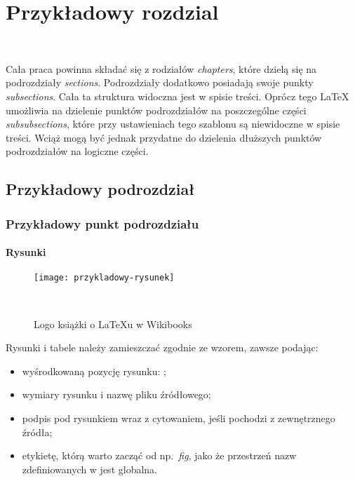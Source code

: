 \chapter{Przykładowy rozdzial}
~\label{chpt:przykladowy-rozdzial}

Cała praca powinna składać się z rodziałów \emph{chapters}, które dzielą
się na podrozdziały \emph{sections}. Podrozdziały dodatkowo
posiadają swoje punkty \emph{subsections}. Cała ta struktura widoczna
jest w spisie treści. Oprócz tego LaTeX umożliwia na dzielenie punktów
podrozdziałów na poszczególne części \emph{subsubsections}, które przy
ustawieniach tego szablonu są niewidoczne w spisie treści. Wciąż mogą
być jednak przydatne do dzielenia dłuższych punktów podrozdziałów na
logiczne części.

\section{Przykładowy podrozdział}

\subsection{Przykładowy punkt podrozdziału}

\subsubsection{Rysunki}

\begin{figure}[!htb]
    \centering
    \texttt{[image: przykladowy-rysunek]}
    \caption{Logo książki o LaTeXu w Wikibooks~\cite{book:latex}}~\label{fig:przykladowy-rysunek}
\end{figure}

Rysunki i tabele należy zamieszczać zgodnie ze wzorem, zawsze podając:

\begin{itemize}
    \item wyśrodkowaną pozycję rysunku: ;
    \item wymiary rysunku i nazwę pliku źródłowego;
    \item podpis pod rysunkiem wraz z cytowaniem, jeśli pochodzi
    z zewnętrznego źródła;
    \item etykietę, którą warto zacząć od np.\ \emph{fig}, jako że
    przestrzeń nazw zdefiniowanych w  jest
    globalna.
\end{itemize}

